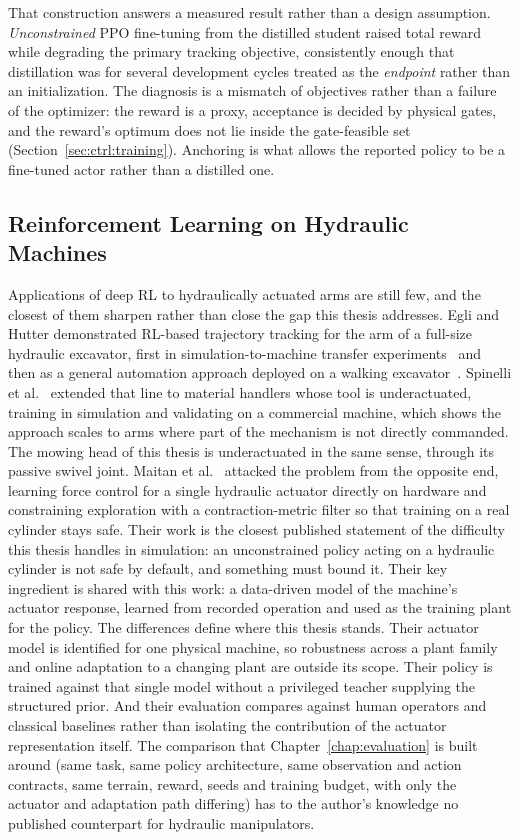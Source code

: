 That construction answers a measured result rather than a design assumption.
\emph{Unconstrained} PPO fine-tuning from the distilled student raised total
reward while degrading the primary tracking objective, consistently enough
that distillation was for several development cycles treated as the
\emph{endpoint} rather than an initialization. The diagnosis is a mismatch of
objectives rather than a failure of the optimizer: the reward is a proxy,
acceptance is decided by physical gates, and the reward's optimum does not
lie inside the gate-feasible set (Section~\ref{sec:ctrl:training}). Anchoring
is what allows the reported \ppoROM{} policy to be a fine-tuned actor rather
than a distilled one.

\subsection{Reinforcement Learning on Hydraulic Machines}

Applications of deep RL to hydraulically actuated arms are still few,
and the closest of them sharpen rather than close the gap this thesis
addresses. Egli and Hutter demonstrated RL-based trajectory tracking for
the arm of a full-size hydraulic excavator, first in
simulation-to-machine transfer experiments~\cite{egli2020towards} and
then as a general automation approach deployed on a walking
excavator~\cite{egli2022general}. Spinelli et
al.~\cite{spinelli2024rl} extended that line to material handlers whose
tool is underactuated, training in simulation and validating on a
commercial machine, which shows the approach scales to arms where part
of the mechanism is not directly commanded. The mowing head of this
thesis is underactuated in the same sense, through its passive swivel
joint. Maitan et al.~\cite{maitan2026contraction} attacked the problem
from the opposite end, learning force control for a single hydraulic
actuator directly on hardware and constraining exploration with a
contraction-metric filter so that training on a real cylinder stays
safe. Their work is the closest published statement of the difficulty
this thesis handles in simulation: an unconstrained policy acting on a
hydraulic cylinder is not safe by default, and something must bound it.
Their key ingredient is shared with
this work: a data-driven model of the machine's actuator response,
learned from recorded operation and used as the training plant for the
policy. The differences define where this thesis stands. Their actuator
model is identified for one physical machine, so robustness across a
plant family and online adaptation to a changing plant are outside its
scope. Their policy is trained against that single model without a
privileged teacher supplying the structured prior. And their evaluation
compares against human operators and classical baselines rather than
isolating the contribution of the actuator representation itself. The
comparison that Chapter~\ref{chap:evaluation} is built around (same task, same policy architecture, same observation and action contracts,
same terrain, reward, seeds and training budget, with only the actuator and adaptation path differing) has to the author's knowledge no
published counterpart for hydraulic manipulators.

